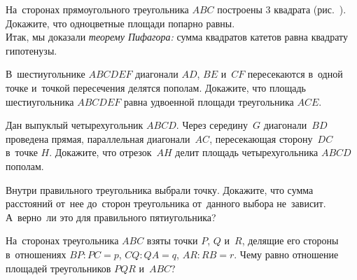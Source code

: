 \begin{problems}
\item{}
На~сторонах прямоугольного треугольника $ABC$ построены 3 квадрата
(рис.~).
Докажите, что одноцветные площади попарно равны.
\\
Итак, мы доказали \emph{теорему Пифагора:} сумма квадратов катетов равна
квадрату гипотенузы.

\item
В~шестиугольнике $ABCDEF$ диагонали $AD$, $BE$ и~$CF$ пересекаются
в~одной точке и~точкой пересечения делятся пополам.
Докажите, что площадь шестиугольника $ABCDEF$ равна удвоенной площади
треугольника $ACE$.

\item
Дан выпуклый четырехугольник $ABCD$.
Через середину~$G$ диагонали~$BD$ проведена прямая, параллельная
диагонали~$AC$, пересекающая сторону~$DC$ в~точке $H$.
Докажите, что отрезок~$AH$ делит площадь четырехугольника $ABCD$ пополам.




\item
Внутри правильного треугольника выбрали точку.
Докажите, что сумма расстояний от~нее до~сторон треугольника от~данного выбора
не~зависит.
А~верно~ли это для правильного пятиугольника?


\item
На~сторонах треугольника $ABC$ взяты точки $P$, $Q$ и~$R$, делящие его стороны
в~отношениях $BP : PC = p$, $CQ : QA = q$, $AR : RB = r$.
Чему равно отношение площадей треугольников $PQR$ и~$ABC$?



\end{problems}
